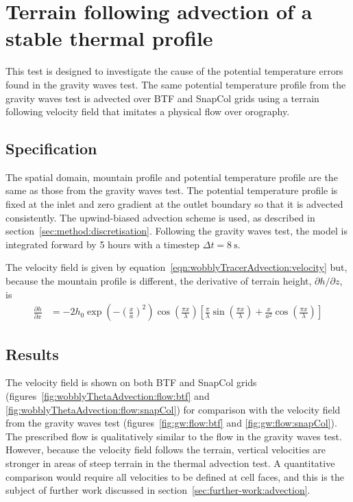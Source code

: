 \section{Terrain following advection of a stable thermal profile}
\label{sec:wobblyThetaAdvection}

This test is designed to investigate the cause of the potential temperature errors found in the gravity waves test.  The same potential temperature profile from the gravity waves test is advected over BTF and SnapCol grids using a terrain following velocity field that imitates a physical flow over orography.

\subsection{Specification}
The spatial domain, mountain profile and potential temperature profile are the same as those from the gravity waves test.  The potential temperature profile is fixed at the inlet and zero gradient at the outlet boundary so that it is advected consistently.  The upwind-biased advection scheme is used, as described in section~\ref{sec:method:discretisation}.  Following the gravity waves test, the model is integrated forward by 5 hours with a timestep $\Delta t = \SI{8}{\second}$. 

The velocity field is given by equation~\ref{eqn:wobblyTracerAdvection:velocity} but, because the mountain profile is different, the derivative of terrain height, $\partial h / \partial z$, is
\begin{align}
\frac{\partial h}{\partial x} &= - 2 h_0 \exp \left( - \left( \frac{x}{a} \right)^2 \right) \cos \left( \frac{\pi x}{\lambda} \right) \left[
\frac{\pi}{\lambda} \sin \left(\frac{\pi x}{\lambda} \right) +
\frac{x}{a^2} \cos \left( \frac{\pi x}{\lambda} \right) \right]
\end{align}

\subsection{Results}
The velocity field is shown on both BTF and SnapCol grids (figures~\ref{fig:wobblyThetaAdvection:flow:btf} and \ref{fig:wobblyThetaAdvection:flow:snapCol}) for comparison with the velocity field from the gravity waves test (figures~\ref{fig:gw:flow:btf} and \ref{fig:gw:flow:snapCol}).  The prescribed flow is qualitatively similar to the flow in the gravity waves test.  However, because the velocity field follows the terrain, vertical velocities are stronger in areas of steep terrain in the thermal advection test.  A quantitative comparison would require all velocities to be defined at cell faces, and this is the subject of further work discussed in section~\ref{sec:further-work:advection}.

